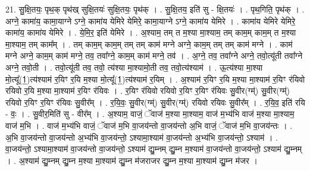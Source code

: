 \documentclass[17pt]{extarticle}
\begin{document}
21. सु॒क्षि॒तयः॒ पृथ॒क् पृथ॑ख् सुक्षि॒तयः॑ सुक्षि॒तयः॒ पृथ॑क् । . सु॒क्षि॒तय॒ इति॑ सु - क्षि॒तयः॑ । . पृथ॒गिति॒ पृथ॑क् । . अग्ने॒ कामा॑य॒ कामा॒याग्ने ऽग्ने॒ कामा॑य येमिरे येमिरे॒ कामा॒याग्ने ऽग्ने॒ कामा॑य येमिरे । . कामा॑य येमिरे येमिरे॒ कामा॑य॒ कामा॑य येमिरे । . ये॒मि॒र॒ इति॑ येमिरे । . अ॒श्याम॒ तम् त म॒श्या मा॒श्याम॒ तम् काम॒म् काम॒म् त म॒श्या मा॒श्याम॒ तम् काम᳚म् । . तम् काम॒म् काम॒म् तम् तम् काम॑ मग्ने अग्ने॒ काम॒म् तम् तम् काम॑ मग्ने । . काम॑ मग्ने अग्ने॒ काम॒म् काम॑ मग्ने॒ तव॒ तवा᳚ग्ने॒ काम॒म् काम॑ मग्ने॒ तव॑ । . अ॒ग्ने॒ तव॒ तवा᳚ग्ने अग्ने॒ तवो॒त्यू॑ती तवा᳚ग्ने अग्ने॒ तवो॒ती । . तवो॒त्यू॑ती तव॒ तवो॒ त्य॑श्या मा॒श्यामो॒ती तव॒ तवो॒त्य॑श्याम॑ । . ऊ॒त्य॑श्या मा॒श्या मो॒त्यू᳚(1॒)त्य॑श्याम॑ र॒यिꣳ र॒यि म॒श्या मो॒त्यू᳚(1॒)त्य॑श्याम॑ र॒यिम् । . अ॒श्याम॑ र॒यिꣳ र॒यि म॒श्या मा॒श्याम॑ र॒यिꣳ र॑यिवो रयिवो र॒यि म॒श्या मा॒श्याम॑ र॒यिꣳ र॑यिवः । . र॒यिꣳ र॑यिवो रयिवो र॒यिꣳ र॒यिꣳ र॑यिवः सु॒वीर(ग्म्॑) सु॒वीर(ग्म्॑) रयिवो र॒यिꣳ र॒यिꣳ र॑यिवः सु॒वीर᳚म् । . र॒यि॒वः॒ सु॒वीर(ग्म्॑) सु॒वीर(ग्म्॑) रयिवो रयिवः सु॒वीर᳚म् । . र॒यि॒व॒ इति॑ रयि - वः॒ । . सु॒वीर॒मिति॑ सु - वीर᳚म् । . अ॒श्याम॒ वाजं॒ ॅवाज॑ म॒श्या मा॒श्याम॒ वाज॑ म॒भ्य॑भि वाज॑ म॒श्या मा॒श्याम॒ वाज॑ म॒भि । . वाज॑ म॒भ्य॑भि वाजं॒ ॅवाज॑ म॒भि वा॒जय॑न्तो वा॒जय॑न्तो अ॒भि वाजं॒ ॅवाज॑ म॒भि वा॒जय॑न्तः । . अ॒भि वा॒जय॑न्तो वा॒जय॑न्तो अ॒भ्य॑भि वा॒जय॑न्तो॒ ऽश्यामा॒श्याम॑ वा॒जय॑न्तो अ॒भ्य॑भि वा॒जय॑न्तो॒ ऽश्याम॑ । . वा॒जय॑न्तो॒ ऽश्यामा॒श्याम॑ वा॒जय॑न्तो वा॒जय॑न्तो॒ ऽश्याम॑ द्यु॒म्नम् द्यु॒म्न म॒श्याम॑ वा॒जय॑न्तो वा॒जय॑न्तो॒ ऽश्याम॑ द्यु॒म्नम् । . अ॒श्याम॑ द्यु॒म्नम् द्यु॒म्न म॒श्या मा॒श्याम॑ द्यु॒म्न म॑जराजर द्यु॒म्न म॒श्या मा॒श्याम॑ द्यु॒म्न म॑जर । \newline
\end{document}

